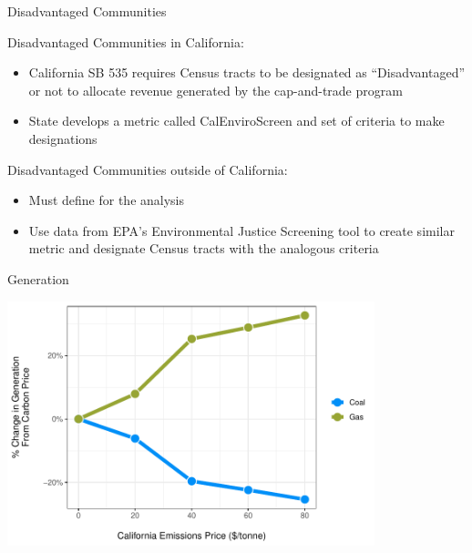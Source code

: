 \documentclass[11pt, aspectratio = 169]{beamer}
\newcommand{\1}{\mathds{1}}
\begin{document}
\begin{frame}{Disadvantaged Communities}

Disadvantaged Communities in California:   
\begin{itemize}
    \item California SB 535 requires Census tracts to be designated as ``Disadvantaged'' or not to allocate revenue generated by the cap-and-trade program
    \item State develops a metric called CalEnviroScreen and set of criteria to make designations
\end{itemize}

\vfill
Disadvantaged Communities outside of California:
\begin{itemize}
    \item Must define for the analysis
    \item Use data from EPA's Environmental Justice Screening tool to create similar metric and designate Census tracts with the analogous criteria
\end{itemize}

\end{frame}





\begin{frame}{Generation}

\centering
\includegraphics[width = 0.8\textwidth]{figures/chapter5_figures/gen_fuel_bca_pct.pdf}

\end{frame}
\end{document}
